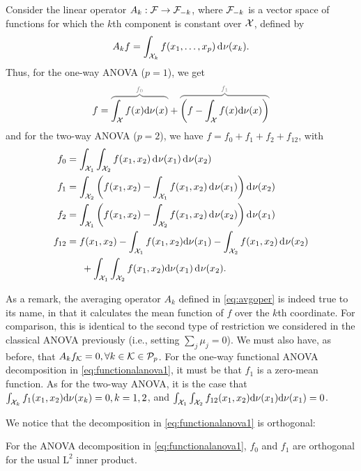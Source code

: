 Consider the linear operator $A_k:{\mathcal F}\to {\mathcal F}_{-k}$, where ${\mathcal F}_{-k}$ is a vector space of functions for which the $k$th component is constant over ${\mathcal X}$, defined by
\begin{align}\label{eq:avgoper}
  A_k f = \int_{{\mathcal X}_k} f(x_1,\dots,x_p) \operatorname{d}\hspace{0.5pt}\! \nu(x_k).
\end{align}
Thus, for the one-way ANOVA ($p=1$), we get
\begin{align}\label{eq:functionalanova1}
  f = 
  \greyoverbrace{\int_\cX f(x)\d\nu(x)}{f_0} 
  + 
  \greyoverbrace{\left( f - \int_\cX f(x)\d\nu(x) \right)}{f_1}
\end{align}
and for the two-way ANOVA ($p=2$), we have $f = f_0 + f_1 + f_2 + f_{12}$, with
\begin{align*}
  f_0 &= \int_{\cX_1}\int_{\cX_2} f(x_1,x_2) \dint\nu(x_1)\dint\nu(x_2) \\
  f_1 &= \int_{\cX_2} \left( f(x_1,x_2) - \int_{\cX_1} f(x_1,x_2) \dint\nu(x_1) \right) \dint\nu(x_2)\\  
  f_2 &= \int_{\cX_1} \left( f(x_1,x_2) - \int_{\cX_2} f(x_1,x_2) \dint\nu(x_2) \right) \dint\nu(x_1)\\  
  f_{12} &= f(x_1,x_2) - \int_{\cX_1} f(x_1,x_2) \d\nu(x_1) - \int_{\cX_2} f(x_1,x_2) \dint\nu(x_2) \\
  &\phantom{==} + \int_{\cX_1}\int_{\cX_2} f(x_1,x_2) \d\nu(x_1) \dint\nu(x_2).
\end{align*}

As a remark, the averaging operator $A_k$ defined in \cref{eq:avgoper} is indeed true to its name, in that it calculates the mean function of $f$ over the $k$th coordinate. 
For comparison, this is identical to the second type of restriction we considered in the classical ANOVA previously (i.e., setting $\sum_j \mu_j = 0$).
We must also have, as before, that $A_kf_{\mathcal K} = 0, \forall k \in {\mathcal K} \in {\mathcal P}_p$.
For the one-way functional ANOVA decomposition in \cref{eq:functionalanova1}, it must be that $f_1$ is a zero-mean function.
As for the two-way ANOVA, it is the case that $\int_{{\mathcal X}_k} f_1(x_1,x_2) \text{d}\nu(x_k) = 0, k=1,2$, and $\int_{{\mathcal X}_1}\int_{{\mathcal X}_2} f_{12}(x_1,x_2) \text{d}\nu(x_1)\text{d}\nu(x_1) = 0$.

We notice that the decomposition in \cref{eq:functionalanova1} is orthogonal:

\begin{claim}
  For the ANOVA decomposition in \cref{eq:functionalanova1}, $f_0$ and $f_1$ are orthogonal for the usual $\text{L}^2$ inner product.
\end{claim}

